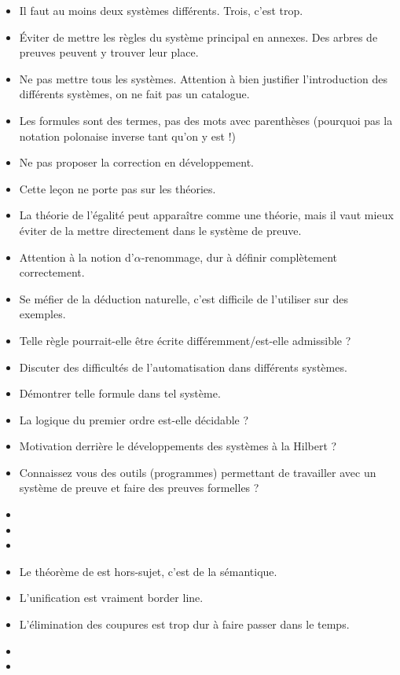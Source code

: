 \documentclass{agregfiche}
\begin{document}
\begin{itemize}
    \item Il faut au moins deux systèmes différents. Trois, c'est trop.
	\item Éviter de mettre les règles du système principal en annexes. Des arbres de preuves peuvent y trouver leur place.
	\item Ne pas mettre tous les systèmes. Attention à bien justifier l'introduction des différents systèmes, on ne fait pas un catalogue.
    \item Les formules sont des termes, pas des mots avec parenthèses (pourquoi pas la notation polonaise inverse tant qu'on y est !)
    \item Ne pas proposer la correction en développement.
	\item Cette leçon ne porte pas sur les théories.
    \item La théorie de l'égalité peut apparaître comme une théorie, mais il vaut mieux éviter de la mettre directement dans le système de preuve.
    \item Attention à la notion d'$\alpha$-renommage, dur à définir 
    complètement correctement.
        \item Se méfier de la déduction naturelle, c'est difficile de 
        l'utiliser sur des exemples.
\end{itemize}

\secquestionsclassiques

\begin{itemize}
    \item Telle règle pourrait-elle être écrite différemment/est-elle admissible ?
	\item Discuter des difficultés de l'automatisation dans 
	différents systèmes.
	\item Démontrer telle formule dans tel système.
	\item La logique du premier ordre est-elle décidable ?
	\item Motivation derrière le développements des systèmes à la 
	Hilbert ?
	\item Connaissez vous des outils (programmes) permettant de 
	travailler avec un système de preuve et faire des preuves 
	formelles ?

\end{itemize}

\secreferences

\begin{itemize}
\item 
\item 
\item 



\end{itemize}

\secdev

\begin{itemize}
\item Le théorème de  est hors-sujet, c'est de la sémantique.
\item L'unification est vraiment border line.
\item L'élimination des coupures est trop dur à faire passer dans le temps.
\item 
\item 
\end{itemize}
\end{document}
